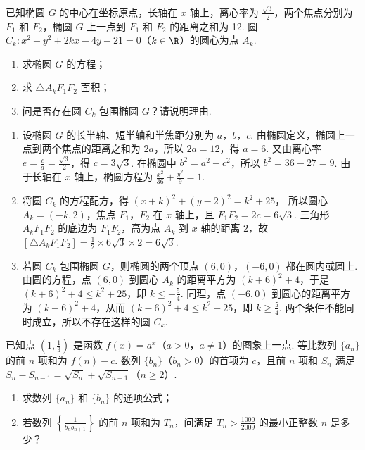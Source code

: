\begin{problem}
已知椭圆 \(G\) 的中心在坐标原点，长轴在 \(x\) 轴上，离心率为 \(\frac{\sqrt{3}}{2}\)，两个焦点分别为 \(F_{1}\) 和 \(F_{2}\)，椭圆 \(G\) 上一点到 \(F_{1}\) 和 \(F_{2}\) 的距离之和为 12. 圆 \(C_{k}: x^{2} + y^{2} + 2kx - 4y - 21 = 0\)（\(k \in \R\)）的圆心为点 \(A_{k}\).
\begin{enumerate}
\item 求椭圆 \(G\) 的方程；
\item 求 \( \triangle A_{k}F_{1}F_{2} \) 面积；
\item 问是否存在圆 \(C_{k}\) 包围椭圆 \(G\)？请说明理由.
\end{enumerate}
\end{problem}

\begin{solution}
\begin{enumerate}
\item 设椭圆 \(G\) 的长半轴、短半轴和半焦距分别为 \(a\)，\(b\)，\(c\). 由椭圆定义，椭圆上一点到两个焦点的距离之和为 \(2a\)，所以 \(2a=12\)，得 \(a=6\). 又由离心率 \(e=\frac ca=\frac{\sqrt3}{2}\)，得 \(c=3\sqrt3\). 在椭圆中 \(b^2=a^2-c^2\)，所以 \(b^2=36-27=9\). 由于长轴在 \(x\) 轴上，椭圆方程为
\(\displaystyle\frac{x^2}{36}+\frac{y^2}{9}=1\).
\item 将圆 \(C_k\) 的方程配方，得 \((x+k)^2+(y-2)^2=k^2+25\)，
所以圆心 \(A_k=(-k,2)\)，焦点 \(F_1\)，\(F_2\) 在 \(x\) 轴上，且 \(F_1F_2=2c=6\sqrt3\). 三角形 \(A_kF_1F_2\) 的底边为 \(F_1F_2\)，高为点 \(A_k\) 到 \(x\) 轴的距离 \(2\)，故
\(\left[ \triangle A_kF_1F_2\right]=\frac12\times6\sqrt3\times2=6\sqrt3\).
\item 若圆 \(C_k\) 包围椭圆 \(G\)，则椭圆的两个顶点 \((6,0)\)，\((-6,0)\) 都在圆内或圆上. 由圆的方程，点 \((6,0)\) 到圆心 \(A_k\) 的距离平方为 \((k+6)^2+4\)，于是
\((k+6)^2+4\leq k^2+25\)，即 \(k\leq-\frac54\). 同理，点 \((-6,0)\) 到圆心的距离平方为 \((k-6)^2+4\)，从而
\((k-6)^2+4\leq k^2+25\)，即 \(k\geq\frac54\). 两个条件不能同时成立，所以不存在这样的圆 \(C_k\).
\end{enumerate}
\end{solution}

\begin{problem}
已知点 \(\left(1, \frac{1}{3}\right)\) 是函数 \(f(x) = a^x\)（\(a > 0\)，\(a \neq 1\)）的图象上一点. 等比数列 \(\{a_n\}\) 的前 \(n\) 项和为 \(f(n) - c\). 数列 \(\{b_n\}\)（\(b_n > 0\)）的首项为 \(c\)，且前 \(n\) 项和 \(S_n\) 满足 \(S_n - S_{n-1} = \sqrt{S_n} + \sqrt{S_{n-1}}\)（\(n \ge 2\)）.

\begin{enumerate}
\item 求数列 \(\{a_n\}\) 和 \(\{b_n\}\) 的通项公式；
\item 若数列 \(\left\{\frac{1}{b_n b_{n+1}}\right\}\) 的前 \(n\) 项和为 \(T_n\)，问满足 \(T_n > \frac{1000}{2009}\) 的最小正整数 \(n\) 是多少？
\end{enumerate}
\end{problem}

